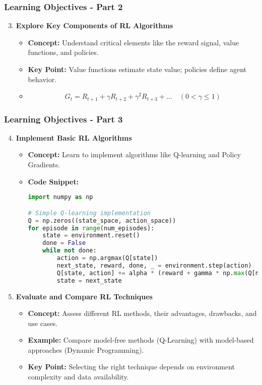 \documentclass[aspectratio=169]{beamer}
\begin{document}
\begin{frame}[fragile]
  \frametitle{Learning Objectives - Part 2}
  \begin{enumerate}
    \setcounter{enumi}{2}
    
    \item \textbf{Explore Key Components of RL Algorithms}
      \begin{itemize}
        \item \textbf{Concept:} Understand critical elements like the reward signal, value functions, and policies.
        \item \textbf{Key Point:} Value functions estimate state value; policies define agent behavior.
        \item \begin{equation}
            G_t = R_{t+1} + \gamma R_{t+2} + \gamma^2 R_{t+3} + \ldots \quad (0 < \gamma \leq 1)
          \end{equation}
      \end{itemize}
  \end{enumerate}
\end{frame}

\begin{frame}[fragile]
  \frametitle{Learning Objectives - Part 3}
  \begin{enumerate}
    \setcounter{enumi}{3}
    
    \item \textbf{Implement Basic RL Algorithms}
      \begin{itemize}
        \item \textbf{Concept:} Learn to implement algorithms like Q-learning and Policy Gradients.
        \item \textbf{Code Snippet:}
          \begin{lstlisting}[language=Python]
import numpy as np

# Simple Q-learning implementation
Q = np.zeros((state_space, action_space))
for episode in range(num_episodes):
    state = environment.reset()
    done = False
    while not done:
        action = np.argmax(Q[state])
        next_state, reward, done, _ = environment.step(action)
        Q[state, action] += alpha * (reward + gamma * np.max(Q[next_state]) - Q[state, action])
        state = next_state
          \end{lstlisting}
      \end{itemize}
      
    \item \textbf{Evaluate and Compare RL Techniques}
      \begin{itemize}
        \item \textbf{Concept:} Assess different RL methods, their advantages, drawbacks, and use cases.
        \item \textbf{Example:} Compare model-free methods (Q-Learning) with model-based approaches (Dynamic Programming).
        \item \textbf{Key Point:} Selecting the right technique depends on environment complexity and data availability.
      \end{itemize}
  \end{enumerate}
\end{frame}
\end{document}
